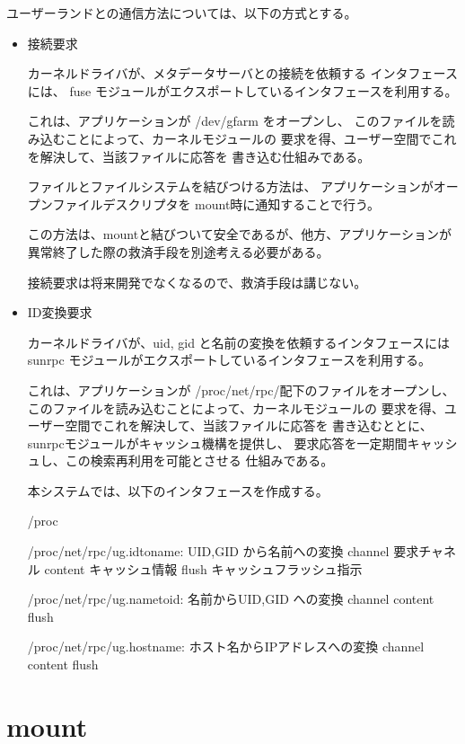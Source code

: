 ユーザーランドとの通信方法については、以下の方式とする。
\begin{itemize}
\item	接続要求	\par
	カーネルドライバが、メタデータサーバとの接続を依頼する
	インタフェースには、
	fuse モジュールがエクスポートしているインタフェースを利用する。

	これは、アプリケーションが /dev/gfarm をオープンし、
	このファイルを読み込むことによって、カーネルモジュールの
	要求を得、ユーザー空間でこれを解決して、当該ファイルに応答を
	書き込む仕組みである。

	ファイルとファイルシステムを結びつける方法は、
	アプリケーションがオープンファイルデスクリプタを
	mount時に通知することで行う。
	
	この方法は、mountと結びついて安全であるが、他方、アプリケーションが
	異常終了した際の救済手段を別途考える必要がある。

	接続要求は将来開発でなくなるので、救済手段は講じない。

\item	ID変換要求	\par
	カーネルドライバが、uid, gid と名前の変換を依頼するインタフェースには
	sunrpc モジュールがエクスポートしているインタフェースを利用する。

	これは、アプリケーションが /proc/net/rpc/配下のファイルをオープンし、
	このファイルを読み込むことによって、カーネルモジュールの
	要求を得、ユーザー空間でこれを解決して、当該ファイルに応答を
	書き込むととに、sunrpcモジュールがキャッシュ機構を提供し、
	要求応答を一定期間キャッシュし、この検索再利用を可能とさせる
	仕組みである。
	
	本システムでは、以下のインタフェースを作成する。
	\begin{itembox}[l]{/proc}\begin{cprog}
	/proc/net/rpc/ug.idtoname:	UID,GID から名前への変換
			   channel	要求チャネル
			   content	キャッシュ情報
			   flush	キャッシュフラッシュ指示

	/proc/net/rpc/ug.nametoid:	名前からUID,GID への変換
			   channel
			   content
			   flush

	/proc/net/rpc/ug.hostname:	ホスト名からIPアドレスへの変換
			   channel
			   content
			   flush
	\end{cprog}\end{itembox}

\end{itemize}

\section{mount}

